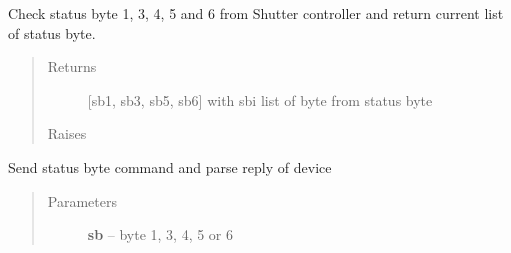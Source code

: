 \documentclass[letterpaper,10pt,english]{sphinxmanual}
\begin{document}
\begin{fulllineitems}

\begin{fulllineitems}
\label{enuActor.Devices:enuActor.Devices.shutter.Shutter.STATUS_BYTE_6}
\end{fulllineitems}


\begin{fulllineitems}
\label{enuActor.Devices:enuActor.Devices.shutter.Shutter.initialise}
\end{fulllineitems}


\begin{fulllineitems}
\label{enuActor.Devices:enuActor.Devices.shutter.Shutter.op_check_status}
Check status byte 1, 3, 4, 5 and 6 from Shutter controller            and return current list of status byte.
\begin{quote}\begin{description}
\item[{Returns}] \leavevmode
{[}sb1, sb3, sb5, sb6{]} with sbi         list of byte from status byte

\item[{Raises}] \leavevmode
{\hyperref[enuActor.Devices:enuActor.Devices.Error.CommErr]{}}

\end{description}\end{quote}

\end{fulllineitems}


\begin{fulllineitems}
\label{enuActor.Devices:enuActor.Devices.shutter.Shutter.parseStatusByte}
Send status byte command and parse reply of device
\begin{quote}\begin{description}
\item[{Parameters}] \leavevmode
\textbf{sb} -- byte 1, 3, 4, 5 or 6


\end{description}
\end{quote}
\end{fulllineitems}
\end{fulllineitems}
\end{document}
